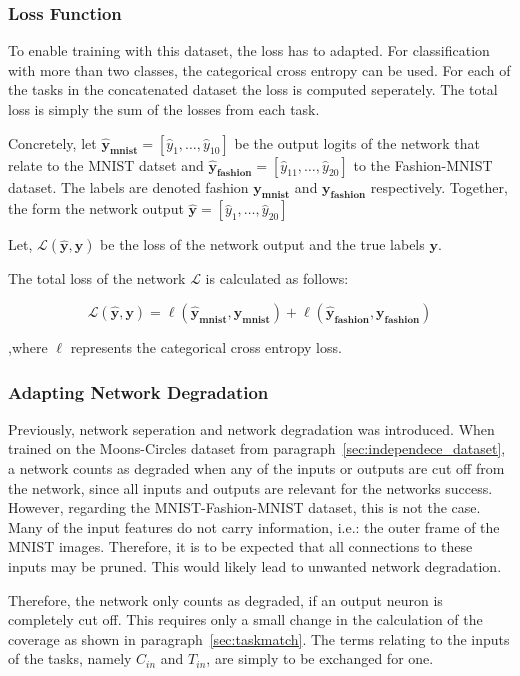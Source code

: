 \subsubsection{Loss Function}
To enable training with this dataset, the loss has to adapted.
For classification with more than two classes, the categorical cross entropy can be used.
For each of the tasks in the concatenated dataset the loss is computed seperately.
The total loss is simply the sum of the losses from each task.

Concretely, let $\mathbf{\hat y_{mnist}} = \left[\hat y_1, \dots, \hat y_{10}\right]$ be the output logits of the network that relate to the MNIST datset and $\mathbf{\hat y_{fashion}} = \left[\hat y_{11}, \dots, \hat y_{20}\right]$ to the Fashion-MNIST dataset.
The labels are denoted fashion $\mathbf{y_{mnist}}$ and $\mathbf{y_{fashion}}$ respectively.
Together, the form the network output $\mathbf{\hat y} = \left[\hat y_1, \dots, \hat y_{20}\right]$

Let, $\mathcal{L} (\mathbf{\hat y}, \mathbf{y})$ be the loss of the network output and the true labels $\mathbf{y}$.

The total loss of the network $\mathcal{L}$ is calculated as follows:

$$
\mathcal{L}  (\mathbf{\hat y}, \mathbf{y})
= \ell  (\mathbf{\hat y_{mnist}}, \mathbf{y_{mnist}})
+ \ell (\mathbf{\hat y_{fashion}}, \mathbf{y_{fashion}})
$$

,where $\ell$ represents the categorical cross entropy loss.

\subsubsection{Adapting Network Degradation}
Previously, network seperation and network degradation was introduced.
When trained on the Moons-Circles dataset from paragraph~\ref{sec:independece_dataset}, a network counts as degraded when any of the inputs or outputs are cut off from the network, since all inputs and outputs are relevant for the networks success.
However, regarding the MNIST-Fashion-MNIST dataset, this is not the case.
Many of the input features do not carry information, i.e.: the outer frame of the MNIST images.
Therefore, it is to be expected that all connections to these inputs may be pruned.
This would likely lead to unwanted network degradation.

Therefore, the network only counts as degraded, if an output neuron is completely cut off.
This requires only a small change in the calculation of the coverage as shown in paragraph~\ref{sec:taskmatch}.
The terms relating to the inputs of the tasks, namely $C_{in}$ and $T_{in}$, are simply to be exchanged for one.